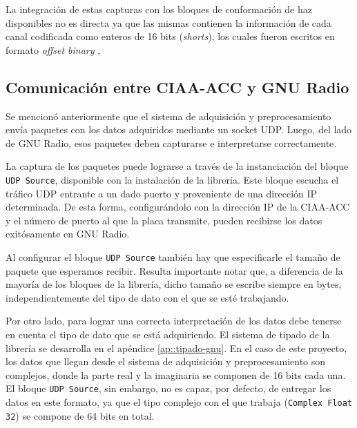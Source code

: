 \documentclass[../../main.tex]{subfiles}
\begin{document}
La integración de estas capturas con los bloques de conformación de haz disponibles no es directa ya que las mismas contienen la información de cada canal codificada como enteros de 16 bits (\textit{shorts}), los cuales fueron escritos en formato \textit{offset binary} , 







\subsection{Comunicación entre CIAA-ACC y GNU Radio}\label{subsec::comuicacion-con-gnuradio}
Se mencionó anteriormente que el sistema de adquisición y preprocesamiento envía paquetes con los datos adquiridos mediante un socket UDP. Luego, del lado de GNU Radio, esos paquetes deben capturarse e interpretarse correctamente. 

La captura de los paquetes puede lograrse a través de la instanciación del bloque \texttt{UDP Source}, disponible con la instalación de la librería. Este bloque escucha el tráfico UDP entrante a un dado puerto y proveniente de una dirección IP  determinada. De esta forma, configurándolo con la dirección IP de la CIAA-ACC y el número de puerto al que la placa transmite, pueden recibirse los datos exitósamente en GNU Radio. 

Al configurar el bloque \texttt{UDP Source} también hay que especificarle el tamaño de paquete que esperamos recibir. Resulta importante notar que, a diferencia de la mayoría de los bloques de la librería, dicho tamaño se escribe siempre en bytes, independientemente del tipo de dato con el que se esté trabajando.

Por otro lado, para lograr una correcta interpretación de los datos debe tenerse en cuenta el tipo de dato que se está adquiriendo. El sistema de tipado de la librería se desarrolla en el apéndice \ref{ap::tipado-gnu}. En el caso de este proyecto, los datos que llegan desde el sistema de adquisición y preprocesamiento son complejos, donde la parte real y la imaginaria se componen de 16 bits cada una.  El bloque \texttt{UDP Source}, sin embargo, no es capaz, por defecto, de entregar los datos en este formato, ya que el tipo complejo con el que trabaja (\texttt{Complex Float 32}) se compone de 64 bits en total.
\end{document}
